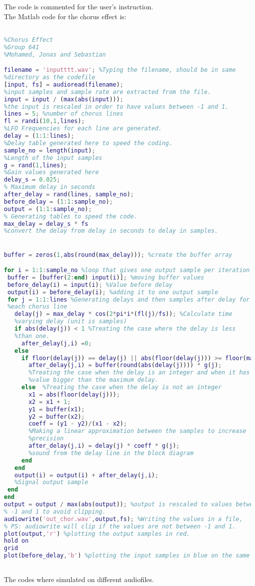 The code is commented for the user's instruction.\\

The Matlab code for the chorus effect is:

\begin{lstlisting}[language=Matlab, caption= Matlab code for chorus effect]

%Chorus Effect
%Group 641
%Mohamed, Jonas and Sebastian

filename = 'inputttt.wav'; %Typing the filename, should be in same 
%directory as the codefile
[input, fs] = audioread(filename);
%input samples and sample rate are extracted from the file.
input = input / (max(abs(input)));
%the input is rescaled in order to have values between -1 and 1.
lines = 5; %number of chorus lines 
fl = randi(10,1,lines);
%LFO Frequencies for each line are generated.
delay = (1:1:lines);
%Delay table generated here to speed the coding. 
sample_no = length(input); 
%Length of the input samples
g = rand(1,lines); 
%Gain values generated here
delay_s = 0.025; 
% Maximum delay in seconds 
after_delay = rand(lines, sample_no); 
before_delay = (1:1:sample_no);
output = (1:1:sample_no);
% Generating tables to speed the code. 
max_delay = delay_s * fs  
%convert the delay from delay in seconds to delay in samples. 


buffer = zeros(1,abs(round(max_delay))); %create the buffer array 

for i = 1:1:sample_no %loop that gives one output sample per iteration
 buffer = [buffer(2:end) input(i)]; %moving buffer values
 before_delay(i) = input(i); %Value before delay
 output(i) = before_delay(i); %adding it to one output sample
 for j = 1:1:lines %Generating delays and then samples after delay for 
 %each chorus line
   delay(j) = max_delay * cos(2*pi*i*(fl(j)/fs)); %Calculate time  
   %varying delay (unit is samples)
   if abs(delay(j)) < 1 %Treating the case where the delay is less 
   %than one.
	 after_delay(j,i) =0;
   else
	 if floor(delay(j)) == delay(j) || abs(floor(delay(j))) >= floor(max_delay)
	   after_delay(j,i) = buffer(round(abs(delay(j)))) * g(j);
	   %Treating the case when the delay is an integer and when it has a
	   %value bigger than the maximum delay. 
	 else  %Treating the case when the delay is not an integer
	   x1 = abs(floor(delay(j)));
	   x2 = x1 + 1;
	   y1 = buffer(x1);
	   y2 = buffer(x2);
	   coeff = (y1 - y2)/(x1 - x2);
	   %Making a linear approximation between the samples to increase
	   %precision
	   after_delay(j,i) = delay(j) * coeff * g(j);  
	   %sound from the delay line in the block diagram
	 end
   end
   output(i) = output(i) + after_delay(j,i);
   %Signal output sample
 end
end
output = output / max(abs(output)); %output is rescaled to values between
% -1 and 1 to avoid clipping. 
audiowrite('out_chor.wav',output,fs); %Writing the values in a file, 
% PS: audiowrite will clip if the values are not between -1 and 1.
plot(output,'r') %plotting the output samples in red.
hold on
grid
plot(before_delay,'b') %plotting the input samples in blue on the same fig.



\end{lstlisting}

The codes where simulated on different audiofiles. 


